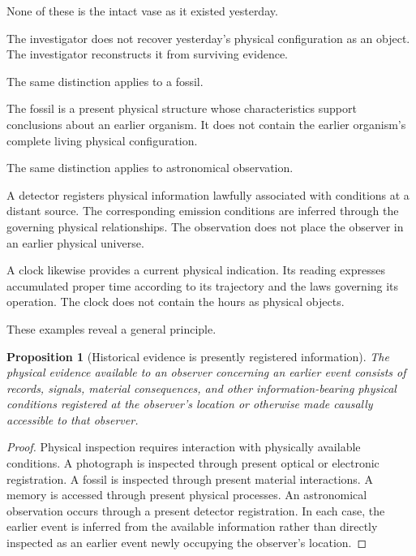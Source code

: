 \documentclass[12pt,onecolumn]{article}
\newtheorem{proposition}{Proposition}[section]
\begin{document}
None of these is the intact vase as it existed yesterday.

The investigator does not recover yesterday's physical configuration as an object. The investigator reconstructs it from surviving evidence.

The same distinction applies to a fossil.

The fossil is a present physical structure whose characteristics support conclusions about an earlier organism. It does not contain the earlier organism's complete living physical configuration.

The same distinction applies to astronomical observation.

A detector registers physical information lawfully associated with conditions at a distant source. The corresponding emission conditions are inferred through the governing physical relationships. The observation does not place the observer in an earlier physical universe.

A clock likewise provides a current physical indication. Its reading expresses accumulated proper time according to its trajectory and the laws governing its operation. The clock does not contain the hours as physical objects.

These examples reveal a general principle.

\begin{proposition}[Historical evidence is presently registered information]

The physical evidence available to an observer concerning an earlier event consists of records, signals, material consequences, and other information-bearing physical conditions registered at the observer's location or otherwise made causally accessible to that observer.

\end{proposition}

\begin{proof}

Physical inspection requires interaction with physically available conditions. A photograph is inspected through present optical or electronic registration. A fossil is inspected through present material interactions. A memory is accessed through present physical processes. An astronomical observation occurs through a present detector registration. In each case, the earlier event is inferred from the available information rather than directly inspected as an earlier event newly occupying the observer's location.

\end{proof}
\end{document}

